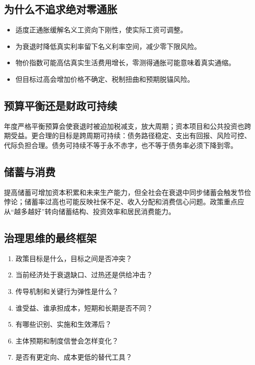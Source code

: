 \documentclass[UTF8,11pt,a4paper]{ctexart}
\begin{document}
\subsection{为什么不追求绝对零通胀}
\begin{itemize}
  \item 适度正通胀缓解名义工资向下刚性，使实际工资可调整。
  \item 为衰退时降低真实利率留下名义利率空间，减少零下限风险。
  \item 物价指数可能高估真实生活费用增长，零测得通胀可能意味着真实通缩。
  \item 但目标过高会增加价格不确定、税制扭曲和预期脱锚风险。
\end{itemize}

\subsection{预算平衡还是财政可持续}
年度严格平衡预算会使衰退时被迫加税减支，放大周期；资本项目和公共投资也跨期受益。更合理的目标是跨周期可持续：债务路径稳定、支出有回报、风险可控、代际负担合理。债务可持续不等于永不赤字，也不等于债务率必须下降到零。

\subsection{储蓄与消费}
提高储蓄可增加资本积累和未来生产能力，但全社会在衰退中同步储蓄会触发节俭悖论；储蓄率过高也可能反映社保不足、收入分配和消费信心问题。政策重点应从“越多越好”转向储蓄结构、投资效率和居民消费能力。

\subsection{治理思维的最终框架}
\begin{methodbox}[评价任一宏观政策的七问]
\begin{enumerate}
  \item 政策目标是什么，目标之间是否冲突？
  \item 当前经济处于衰退缺口、过热还是供给冲击？
  \item 传导机制和关键行为弹性是什么？
  \item 谁受益、谁承担成本，短期和长期是否不同？
  \item 有哪些识别、实施和生效滞后？
  \item 主体预期和制度信誉会怎样变化？
  \item 是否有更定向、成本更低的替代工具？
\end{enumerate}
\end{methodbox}
\end{document}
